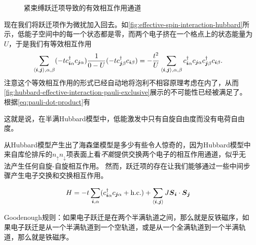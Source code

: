 \begin{figure}
    \centering
    \caption{紧束缚跃迁项导致的有效相互作用通道}
    \label{fig:effective-spin-interaction-hubbard}
\end{figure}

现在我们将跃迁项作为微扰加入回去。如\autoref{fig:effective-spin-interaction-hubbard}所示，低能子空间中的每一个状态都是零，而两个电子挤在一个格点上的状态能量为$U$，于是我们有等效相互作用
\[
    \sum_{\langle \vb*{i}, \vb*{j} \rangle, \alpha, \beta} (-t c^\dagger_{\vb*{i} \alpha} c_{\vb*{j} \alpha}) \frac{1}{0 - U} (-t c^\dagger_{\vb*{j} \beta} c_{\vb*{i} \beta}) = - \frac{t^2}{U} \sum_{\langle \vb*{i}, \vb*{j} \rangle, \alpha, \beta} c^\dagger_{\vb*{i} \alpha} c_{\vb*{j} \alpha} c^\dagger_{\vb*{j} \beta} c_{\vb*{i} \beta}.
\]
注意这个等效相互作用的形式已经自动地将泡利不相容原理考虑在内了，从而\autoref{fig:hubbard-effective-interaction-pauli-exclusive}展示的不可能性已经被满足了。
根据\eqref{eq:pauli-dot-product}有


这就是说，在半满Hubbard模型中，低能激发中只有自旋自由度而没有电荷自由度。

从Hubbard模型产生出了海森堡模型是多少有些令人惊奇的，因为Hubbard模型中来自库伦排斥的$n_\uparrow n_\downarrow$项表面上看\emph{不能}提供交换两个电子的相互作用通道，似乎无法产生任何自旋-自旋相互作用。
然而，跃迁项的存在让我们能够通过一些中间步骤产生电子交换和交换相互作用。

\begin{equation}
    H = - t \sum_{\vb*{i}, \alpha} (c_{\vb*{i} \alpha}^\dagger c_{\vb*{j} \alpha} + \text{h.c.}) + \sum_{\langle \vb*{i}, \vb*{j} \rangle} J \vb*{S}_{\vb*{i}} \cdot \vb*{S}_{\vb*{j}}
\end{equation}

Goodenough规则：如果电子跃迁是在两个半满轨道之间，那么就是反铁磁序，如果电子跃迁是从一个半满轨道到一个空轨道，或是从一个全满轨道到一个半满轨道，那么就是铁磁序。
